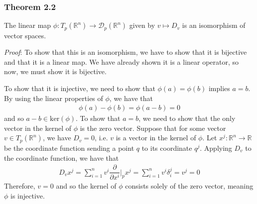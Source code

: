 \documentclass{article}
\newcommand{\R}{\mathbb{R}}
\begin{document}
	\subsubsection*{Theorem 2.2}
	The linear map $\phi: T_p (\R^n) \to \mathcal{D}_p(\R^n)$ given by $v \mapsto D_v$ is an isomorphism of vector spaces.
	
	\noindent \textit{Proof}: To show that this is an isomorphism, we have to show that it is bijective and that it is a linear map. We have already shown it is a linear operator, so now, we must show it is bijective.
	
	To show that it is injective, we need to show that $\phi(a) = \phi(b)$ implies $a = b$. By using the linear properties of $\phi$, we have that
	\begin{gather*}
		\phi(a) - \phi(b) = \phi(a - b) = 0
	\end{gather*}
	and so $a - b \in \text{ker}(\phi)$. To show that $a = b$, we need to show that the only vector in the kernel of $\phi$ is the zero vector. Suppose that for some vector $v \in T_p (\R^n)$, we have $D_v = 0$, i.e. $v$ is a vector in the kernel of $\phi$. Let $x^j : \R^n \to \R$ be the coordinate function sending a point $q$ to its coordinate $q^j$. Applying $D_v$ to the coordinate function, we have that
	\begin{gather*}
		D_v x^j = \sum_{i = 1}^n v^i \dfrac{\partial}{\partial x^i} \Bigg|_p x^j = \sum_{i = 1}^n v^i \delta_i^j = v^j = 0
	\end{gather*}
	Therefore, $v = 0$ and so the kernel of $\phi$ consists solely of the zero vector, meaning $\phi$ is injective.
	
\end{document}
